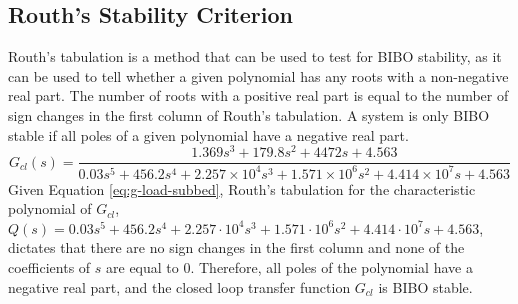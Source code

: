 \documentclass[a4paper,10pt,reqno]{amsart}
\numberwithin{equation}{section}
\begin{document}
\subsection{Routh's Stability Criterion}
Routh's tabulation is a method that can be used to test for BIBO stability, as it can be used to tell whether a given polynomial has any roots with a non-negative real part. The number of roots with a positive real part is equal to the number of sign changes in the first column of Routh's tabulation. A system is only BIBO stable if all poles of a given polynomial have a negative real part.
\begin{equation}
G_{cl}(s)=\frac{1.369 s^3 + 179.8 s^2 + 4472 s + 4.563}{0.03 s^5 + 456.2 s^4 + 2.257 \times 10^{4} s^3 + 1.571 \times 10^{6} s^2 + 4.414 \times 10^{7} s + 4.563}
\label{eq:g-load-subbed}    
\end{equation}
Given Equation \eqref{eq:g-load-subbed}, Routh's tabulation for the characteristic polynomial of $G_{cl}$, $Q(s) = 0.03s^5 + 456.2s^4 + 2.257\cdot 10^4s^3 + 1.571 \cdot 10^6s^2 + 4.414 \cdot 10^7s + 4.563$, dictates that there are no sign changes in the first column and none of the coefficients of $s$ are equal to $0$. Therefore, all poles of the polynomial have a negative real part, and the closed loop transfer function $G_{cl}$ is BIBO stable.
\end{document}
